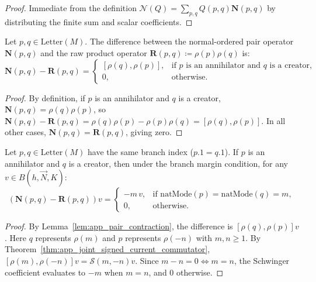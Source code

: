 \begin{proof}
Immediate from the definition $\mathcal{N}(Q) = \sum_{p, q} Q(p, q) \mathbf{N}(p, q)$ by distributing the finite sum and scalar coefficients.
\end{proof}

\begin{lemma}
\label{lem:app_pair_contraction}
Let $p, q \in \mathrm{Letter}(M)$. The difference between the normal-ordered pair operator $\mathbf{N}(p, q)$ and the raw product operator $\mathbf{R}(p, q) \coloneqq \rho(p) \rho(q)$ is:
\begin{equation}
\mathbf{N}(p, q) - \mathbf{R}(p, q) = \begin{cases} [\rho(q), \rho(p)], & \text{if } p \text{ is an annihilator and } q \text{ is a creator}, \\ 0, & \text{otherwise}. \end{cases}
\end{equation}
\end{lemma}

\begin{proof}
By definition, if $p$ is an annihilator and $q$ is a creator, $\mathbf{N}(p, q) = \rho(q) \rho(p)$, so $\mathbf{N}(p, q) - \mathbf{R}(p, q) = \rho(q) \rho(p) - \rho(p) \rho(q) = [\rho(q), \rho(p)]$. In all other cases, $\mathbf{N}(p, q) = \mathbf{R}(p, q)$, giving zero.
\end{proof}

\begin{lemma}
\label{lem:app_contraction_on_budget}
Let $p, q \in \mathrm{Letter}(M)$ have the same branch index ($p.1 = q.1$). If $p$ is an annihilator and $q$ is a creator, then under the branch margin condition, for any $v \in B(h, \vec{N}, K)$:
\begin{equation}
(\mathbf{N}(p, q) - \mathbf{R}(p, q)) v = \begin{cases} -m\, v, & \text{if } \mathrm{natMode}(p) = \mathrm{natMode}(q) = m, \\ 0, & \text{otherwise}. \end{cases}
\end{equation}
\end{lemma}

\begin{proof}
By Lemma~\ref{lem:app_pair_contraction}, the difference is $[\rho(q), \rho(p)] v$. Here $q$ represents $\rho(m)$ and $p$ represents $\rho(-n)$ with $m, n \ge 1$. By Theorem~\ref{thm:app_joint_signed_current_commutator}, $[\rho(m), \rho(-n)] v = \mathcal{S}(m, -n) v$. Since $m - n = 0 \iff m = n$, the Schwinger coefficient evaluates to $-m$ when $m = n$, and $0$ otherwise.
\end{proof}

